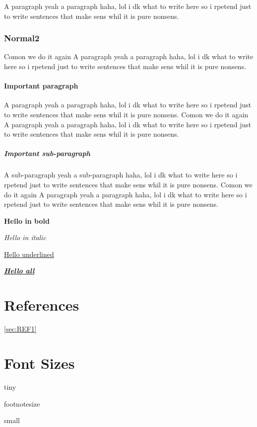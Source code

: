 \documentclass{article}
\begin{document}
A paragraph yeah a paragraph haha, lol i dk what to write here so i rpetend just to write sentences that make sens whil it is pure nonsens. 

\subsubsection{Normal2}

Comon we do it again
A paragraph yeah a paragraph haha, lol i dk what to write here so i rpetend just to write sentences that make sens whil it is pure nonsens. 

\paragraph{Important paragraph}

A paragraph yeah a paragraph haha, lol i dk what to write here so i rpetend just to write sentences that make sens whil it is pure nonsens. 
Comon we do it again
A paragraph yeah a paragraph haha, lol i dk what to write here so i rpetend just to write sentences that make sens whil it is pure nonsens. 

\subparagraph{Important sub-paragraph}

A sub-paragraph yeah a sub-paragraph haha, lol i dk what to write here so i rpetend just to write sentences that make sens whil it is pure nonsens. 
Comon we do it again
A paragraph yeah a paragraph haha, lol i dk what to write here so i rpetend just to write sentences that make sens whil it is pure nonsens. 

\textbf{Hello in bold} 

\textit{Hello in italic} 

\underline{Hello underlined} 

\underline{\textbf{\textit{Hello all}}} 

\section{References}

\ref{sec:REF1}

\pageref{sec:REF1}

\section{Font Sizes}

{\tiny tiny}

{\footnotesize footnotesize}

{\small small}
\end{document}
